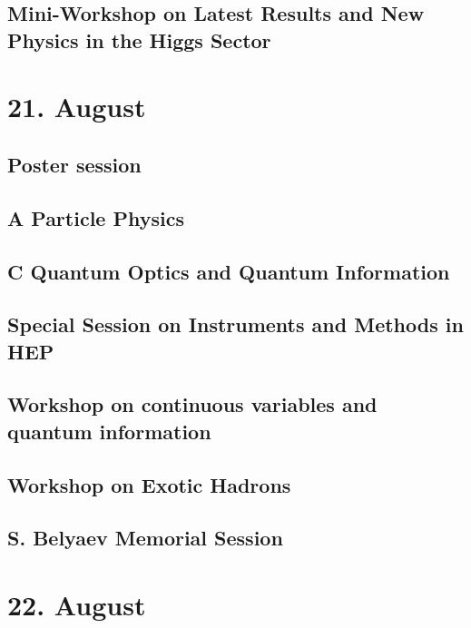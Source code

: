 \subsection{Mini-Workshop on Latest Results and New Physics in the Higgs Sector}

\clearpage

\section{21. August}
\subsection{Poster session}

\clearpage

\subsection{A Particle Physics}

\clearpage

\subsection{C Quantum Optics and Quantum Information}

\clearpage

\subsection{Special Session on Instruments and Methods in HEP}

\clearpage

\subsection{Workshop on continuous variables and quantum information}

\clearpage

\subsection{Workshop on Exotic Hadrons}

\clearpage

\subsection{S. Belyaev Memorial Session}

\clearpage

\section{22. August}

